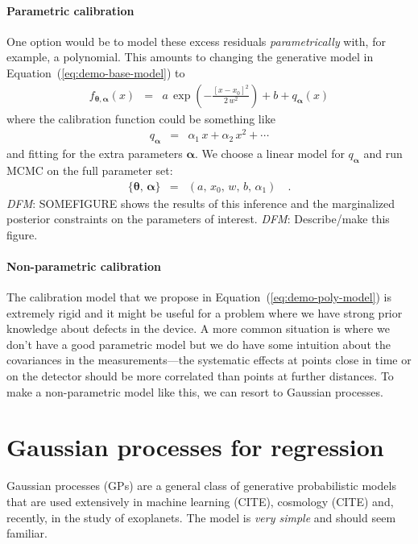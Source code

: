 \documentclass[12pt,preprint]{aastex}
\newcommand{\Eq}[1]{Equation~(\ref{eq:#1})}
\newcommand{\eq}[1]{\Eq{#1}}
\newcommand{\eqlabel}[1]{\label{eq:#1}}
\newcommand{\sectlabel}[1]{\label{sect:#1}}
\newcommand{\bvec}[1]{{\ensuremath{\boldsymbol{#1}}}}
\newcommand{\todo}[3]{{\color{#2} \emph{#1}: #3}}
\newcommand{\dfmtodo}[1]{\todo{DFM}{red}{#1}}
\begin{document}
\paragraph{Parametric calibration}

One option would be to model these excess residuals \emph{parametrically}
with, for example, a polynomial.
This amounts to changing the generative model in \eq{demo-base-model} to
\begin{eqnarray}\eqlabel{demo-poly-model}
f_{\bvec{\theta},\bvec{\alpha}}(x) &=&
    a\,\exp\left(-\frac{[x - x_0]^2}{2\,w^2}\right) + b
    + q_\bvec{\alpha} (x)
\end{eqnarray}
where the calibration function could be something like
\begin{eqnarray}
q_\bvec{\alpha} &=& \alpha_1\,x + \alpha_2\,x^2 + \cdots
\end{eqnarray}
and fitting for the extra parameters $\bvec{\alpha}$.
We choose a linear model for $q_\bvec{\alpha}$ and run MCMC on the full
parameter set:
\begin{eqnarray}
\{\bvec{\theta},\,\bvec{\alpha}\} &=& (a,\,x_0,\,w,\,b,\,\alpha_1) \quad.
\end{eqnarray}
\dfmtodo{SOMEFIGURE} shows the results of this inference and the marginalized
posterior constraints on the parameters of interest.
\dfmtodo{Describe/make this figure.}

\paragraph{Non-parametric calibration}

The calibration model that we propose in \eq{demo-poly-model} is extremely
rigid and it might be useful for a problem where we have strong prior
knowledge about defects in the device.
A more common situation is where we don't have a good parametric model but we
do have some intuition about the covariances in the measurements---the
systematic effects at points close in time or on the detector should be more
correlated than points at further distances.
To make a non-parametric model like this, we can resort to Gaussian processes.

\section{Gaussian processes for regression}\sectlabel{gps}

Gaussian processes (GPs) are a general class of generative probabilistic
models that are used extensively in machine learning (CITE), cosmology (CITE)
and, recently, in the study of exoplanets.
The model is \emph{very simple} and should seem familiar.
\end{document}
